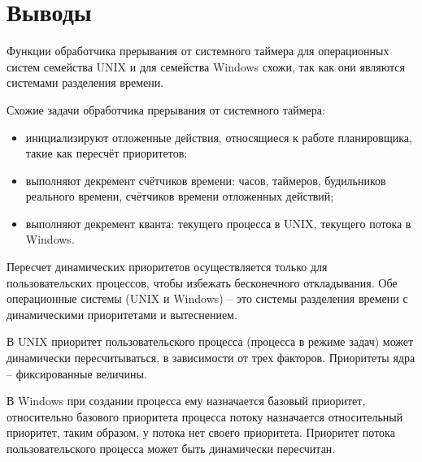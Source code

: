\section*{Выводы}

Функции обработчика прерывания от системного таймера для операционных систем семейства UNIX и для семейства Windows схожи, так как они являются системами разделения времени.

 Схожие задачи обработчика прерывания от системного таймера:
\begin{itemize}
	\item инициализируют отложенные действия, относящиеся к работе планировщика, такие как пересчёт приоритетов;
	\item выполняют декремент счётчиков времени: часов, таймеров, будильников реального времени, счётчиков времени отложенных действий;
	\item выполняют декремент кванта: текущего процесса в UNIX, текущего потока в Windows.
\end{itemize}

Пересчет динамических приоритетов осуществляется только для пользовательских процессов, чтобы избежать бесконечного откладывания. Обе операционные системы (UNIX и Windows) -- это системы разделения времени с динамическими приоритетами и вытеснением.

В UNIX приоритет пользовательского процесса (процесса в режиме задач) может динамически пересчитываться, в зависимости от трех факторов. Приоритеты ядра -- фиксированные величины.

В Windows при создании процесса ему назначается базовый приоритет, относительно базового приоритета процесса потоку назначается относительный приоритет, таким образом, у потока нет своего приоритета. Приоритет потока пользовательского процесса может быть динамически пересчитан.